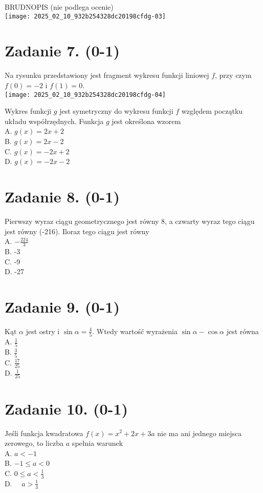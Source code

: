 \documentclass[10pt]{article}
\begin{document}
BRUDNOPIS (nie podlega ocenie)\\
\texttt{[image: 2025\_02\_10\_932b254328dc20198cfdg-03]}

\section*{Zadanie 7. (0-1)}
Na rysunku przedstawiony jest fragment wykresu funkcji liniowej \(f\), przy czym \(f(0)=-2\) i \(f(1)=0\).\\
\texttt{[image: 2025\_02\_10\_932b254328dc20198cfdg-04]}

Wykres funkcji \(g\) jest symetryczny do wykresu funkcji \(f\) względem początku układu współrzędnych. Funkcja \(g\) jest określona wzorem\\
A. \(g(x)=2 x+2\)\\
B. \(g(x)=2 x-2\)\\
C. \(g(x)=-2 x+2\)\\
D. \(g(x)=-2 x-2\)

\section*{Zadanie 8. (0-1)}
Pierwszy wyraz ciągu geometrycznego jest równy 8, a czwarty wyraz tego ciągu jest równy (-216). Iloraz tego ciągu jest równy\\
A. \(-\frac{224}{3}\)\\
B. -3\\
C. -9\\
D. -27

\section*{Zadanie 9. (0-1)}
Kąt \(\alpha\) jest ostry i \(\sin \alpha=\frac{4}{5}\). Wtedy wartość wyrażenia \(\sin \alpha-\cos \alpha\) jest równa\\
A. \(\frac{1}{5}\)\\
B. \(\frac{3}{5}\)\\
C. \(\frac{17}{25}\)\\
D. \(\frac{1}{25}\)

\section*{Zadanie 10. (0-1)}
Jeśli funkcja kwadratowa \(f(x)=x^{2}+2 x+3 a\) nie ma ani jednego miejsca zerowego, to liczba \(a\) spełnia warunek\\
A. \(a<-1\)\\
B. \(-1 \leq a<0\)\\
C. \(0 \leq a<\frac{1}{3}\)\\
D. \(\quad a>\frac{1}{3}\)
\end{document}
